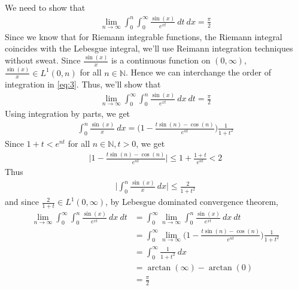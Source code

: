 \documentclass[12pt]{exam}
\theoremstyle{plain} %
\theoremstyle{definition} %
\theoremstyle{remark} %
\begin{document}
\begin{questions}
  \question
  \begin{solution}
    We need to show that
    \begin{align}
      \label{eq:3}
      \lim_{ n \to \infty} \int_{0}^{n} \int_{0}^{\infty}
      \frac{\sin(x)}{e^{xt}} \ dt \ dx =
      \frac{\pi}{2}
    \end{align}
    Since we know that for Riemann integrable functions, the Riemann
    integral coincides with the Lebesgue integral, we'll use Reimann
    integration techniques without sweat. Since $\frac{\sin(x)}{x}$
    is a continuous function on $(0, \infty)$, $\frac{\sin(x)}{x} \in
    L^{1}(0, n)$ for all $n \in \mathbb{N}$. Hence we can interchange
    the order of integration in \autoref{eq:3}. Thus, we'll show that
    \begin{align*}
      \lim_{ n \to \infty} \int_{0}^{\infty}\int_{0}^{n}
      \frac{\sin(x)}{e^{xt}} \ dx \ dt =
      \frac{\pi}{2}
    \end{align*}
    Using integration by parts, we get
    \begin{align*}
      \int_{0}^{n} \frac{\sin(x)}{x} \ dx = \Big(1 - \frac{t\sin(n) -
      \cos(n)}{e^{nt}}\Big) \frac{1}{1 + t^2}
    \end{align*}
    Since $1 + t < e^{nt}$ for all $n \in \mathbb{N}, t > 0$, we get
    \begin{align*}
      \Big|1 - \frac{t\sin(n) - \cos(n)}{e^{nt}}\Big| \le 1 +
      \frac{1+t}{e^{nt}} < 2
    \end{align*}
    Thus
    \begin{align*}
      \Big|\int_{0}^{n} \frac{\sin(x)}{x} \ dx\Big| \le \frac{2}{1+t^2}
    \end{align*}
    and since $\frac{2}{1+t} \in L^{1}(0, \infty)$, by Lebesgue
    dominated convergence theorem,
    \begin{align*}
      \lim_{ n \to \infty} \int_{0}^{\infty}\int_{0}^{n}
      \frac{\sin(x)}{e^{xt}} \ dx \ dt &= \int_{0}^{\infty} \lim_{ n
      \to \infty} \int_{0}^{n}
      \frac{\sin(x)}{e^{xt}} \ dx \ dt \\
      &= \int_{0}^{\infty} \lim_{n \to \infty} \Big(1 -
      \frac{t\sin(n) - \cos(n)}{e^{nt}}\Big) \frac{1}{1 + t^2} \\
      &= \int_{0}^{\infty} \frac{1}{1+t^2} \ dx \\
      &= \arctan(\infty) - \arctan(0) \\
      &= \frac{\pi}{2}
    \end{align*}
  \end{solution}
\end{questions}
\printbibliography[heading=bibintoc]
\end{document}
